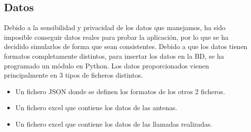     
  \subsection{Datos}
    Debido a la sensibilidad y privacidad de los datos que manejamos, ha sido imposible conseguir datos reales para probar la aplicación, por lo que se ha decidido simularlos de forma que sean consistentes. %
    Debido a que los datos tienen formatos completamente distintos, para insertar los datos en la BD, se ha programado un módulo en Python.
    Los datos proporcionados vienen principalmente en 3 tipos de ficheros distintos.
    \begin{itemize}
      \item Un fichero JSON donde se definen los formatos de los otros 2 ficheros.
      \item Un fichero excel que contiene los datos de las antenas.
      \item Un fichero excel que contiene los datos de las llamadas realizadas.
    \end{itemize}